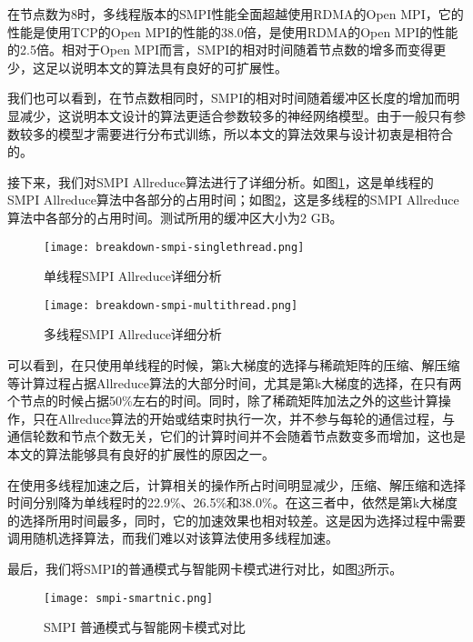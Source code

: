 在节点数为8时，多线程版本的SMPI性能全面超越使用RDMA的Open MPI，它的性能是使用TCP的Open MPI的性能的38.0倍，是使用RDMA的Open MPI的性能的2.5倍。相对于Open MPI而言，SMPI的相对时间随着节点数的增多而变得更少，这足以说明本文的算法具有良好的可扩展性。

我们也可以看到，在节点数相同时，SMPI的相对时间随着缓冲区长度的增加而明显减少，这说明本文设计的算法更适合参数较多的神经网络模型。由于一般只有参数较多的模型才需要进行分布式训练，所以本文的算法效果与设计初衷是相符合的。

接下来，我们对SMPI Allreduce算法进行了详细分析。如图\ref{fig:breakdown-smpi-singlethread}，这是单线程的SMPI Allreduce算法中各部分的占用时间；如图\ref{fig:breakdown-smpi-multithread}，这是多线程的SMPI Allreduce算法中各部分的占用时间。测试所用的缓冲区大小为2 GB。

\begin{figure}[ht] %
    \centering
    \texttt{[image: breakdown-smpi-singlethread.png]}
    \caption{单线程SMPI Allreduce详细分析}
    \label{fig:breakdown-smpi-singlethread}
  \end{figure}

  \begin{figure}[ht] %
    \centering
    \texttt{[image: breakdown-smpi-multithread.png]}
    \caption{多线程SMPI Allreduce详细分析}
    \label{fig:breakdown-smpi-multithread}
  \end{figure}

可以看到，在只使用单线程的时候，第k大梯度的选择与稀疏矩阵的压缩、解压缩等计算过程占据Allreduce算法的大部分时间，尤其是第k大梯度的选择，在只有两个节点的时候占据50\%左右的时间。同时，除了稀疏矩阵加法之外的这些计算操作，只在Allreduce算法的开始或结束时执行一次，并不参与每轮的通信过程，与通信轮数和节点个数无关，它们的计算时间并不会随着节点数变多而增加，这也是本文的算法能够具有良好的扩展性的原因之一。

在使用多线程加速之后，计算相关的操作所占时间明显减少，压缩、解压缩和选择时间分别降为单线程时的22.9\%、26.5\%和38.0\%。在这三者中，依然是第k大梯度的选择所用时间最多，同时，它的加速效果也相对较差。这是因为选择过程中需要调用随机选择算法，而我们难以对该算法使用多线程加速。

最后，我们将SMPI的普通模式与智能网卡模式进行对比，如图\ref{fig:smpi-smartnic}所示。

\begin{figure}[ht] %
    \centering
    \texttt{[image: smpi-smartnic.png]}
    \caption{SMPI 普通模式与智能网卡模式对比}
    \label{fig:smpi-smartnic}
  \end{figure}

